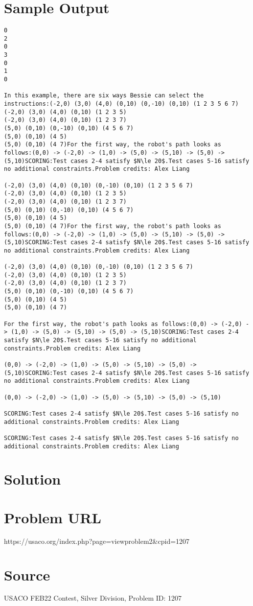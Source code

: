 \documentclass[12pt]{article}
\begin{document}
\section*{Sample Output}
\begin{verbatim}
0
2
0
3
0
1
0

In this example, there are six ways Bessie can select the instructions:(-2,0) (3,0) (4,0) (0,10) (0,-10) (0,10) (1 2 3 5 6 7)
(-2,0) (3,0) (4,0) (0,10) (1 2 3 5)
(-2,0) (3,0) (4,0) (0,10) (1 2 3 7)
(5,0) (0,10) (0,-10) (0,10) (4 5 6 7)
(5,0) (0,10) (4 5)
(5,0) (0,10) (4 7)For the first way, the robot's path looks as follows:(0,0) -> (-2,0) -> (1,0) -> (5,0) -> (5,10) -> (5,0) -> (5,10)SCORING:Test cases 2-4 satisfy $N\le 20$.Test cases 5-16 satisfy no additional constraints.Problem credits: Alex Liang

(-2,0) (3,0) (4,0) (0,10) (0,-10) (0,10) (1 2 3 5 6 7)
(-2,0) (3,0) (4,0) (0,10) (1 2 3 5)
(-2,0) (3,0) (4,0) (0,10) (1 2 3 7)
(5,0) (0,10) (0,-10) (0,10) (4 5 6 7)
(5,0) (0,10) (4 5)
(5,0) (0,10) (4 7)For the first way, the robot's path looks as follows:(0,0) -> (-2,0) -> (1,0) -> (5,0) -> (5,10) -> (5,0) -> (5,10)SCORING:Test cases 2-4 satisfy $N\le 20$.Test cases 5-16 satisfy no additional constraints.Problem credits: Alex Liang

(-2,0) (3,0) (4,0) (0,10) (0,-10) (0,10) (1 2 3 5 6 7)
(-2,0) (3,0) (4,0) (0,10) (1 2 3 5)
(-2,0) (3,0) (4,0) (0,10) (1 2 3 7)
(5,0) (0,10) (0,-10) (0,10) (4 5 6 7)
(5,0) (0,10) (4 5)
(5,0) (0,10) (4 7)

For the first way, the robot's path looks as follows:(0,0) -> (-2,0) -> (1,0) -> (5,0) -> (5,10) -> (5,0) -> (5,10)SCORING:Test cases 2-4 satisfy $N\le 20$.Test cases 5-16 satisfy no additional constraints.Problem credits: Alex Liang

(0,0) -> (-2,0) -> (1,0) -> (5,0) -> (5,10) -> (5,0) -> (5,10)SCORING:Test cases 2-4 satisfy $N\le 20$.Test cases 5-16 satisfy no additional constraints.Problem credits: Alex Liang

(0,0) -> (-2,0) -> (1,0) -> (5,0) -> (5,10) -> (5,0) -> (5,10)

SCORING:Test cases 2-4 satisfy $N\le 20$.Test cases 5-16 satisfy no additional constraints.Problem credits: Alex Liang

SCORING:Test cases 2-4 satisfy $N\le 20$.Test cases 5-16 satisfy no additional constraints.Problem credits: Alex Liang
\end{verbatim}

\section*{Solution}


\section*{Problem URL}
https://usaco.org/index.php?page=viewproblem2&cpid=1207

\section*{Source}
USACO FEB22 Contest, Silver Division, Problem ID: 1207
\end{document}

